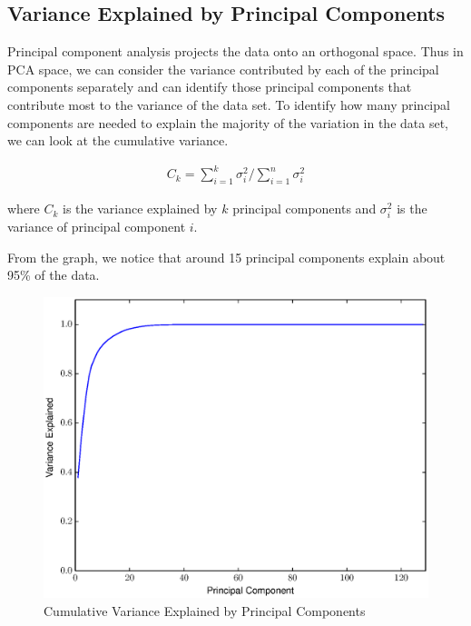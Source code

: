 \documentclass[12pt,letterpaper]{article}
\begin{document}
\subsection{Variance Explained by Principal Components}
Principal component analysis projects the data onto an orthogonal space. Thus in
PCA space, we can consider the variance contributed by each of the principal
components separately and can identify those principal components that
contribute most to the variance of the data set. To identify how many principal
components are needed to explain the majority of the variation in the data set,
we can look at the cumulative variance.

\begin{align*}
  C_k = \sum_{i=1}^{k} \sigma_i^2 / \sum_{i=1}^n \sigma_i^2
\end{align*}

where $C_k$ is the variance explained by $k$ principal components and
$\sigma_i^2$ is the variance of principal component $i$.

From the graph, we notice that around 15 principal components explain about 95\%
of the data.

\begin{figure}[ht]
  \begin{center}
    \includegraphics[scale=0.8]{figs/eigenfaces_varexplained.eps}
    \caption{Cumulative Variance Explained by Principal Components}
  \end{center}
\end{figure}
\clearpage

\end{document}
